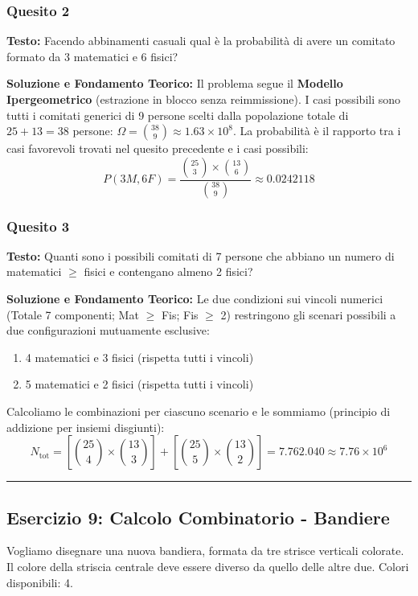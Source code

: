 \documentclass[12pt, a4paper]{article}
\begin{document}
\subsubsection*{Quesito 2}
\textbf{Testo:} Facendo abbinamenti casuali qual è la probabilità di avere un comitato formato da 3 matematici e 6 fisici?

\textbf{Soluzione e Fondamento Teorico:} 
Il problema segue il \textbf{Modello Ipergeometrico} (estrazione in blocco senza reimmissione).
I casi possibili sono tutti i comitati generici di 9 persone scelti dalla popolazione totale di $25 + 13 = 38$ persone: $\Omega = \binom{38}{9} \approx 1.63 \times 10^8$.
La probabilità è il rapporto tra i casi favorevoli trovati nel quesito precedente e i casi possibili:
$$ P(3M, 6F) = \frac{\binom{25}{3} \times \binom{13}{6}}{\binom{38}{9}} \approx 0.0242118 $$

\subsubsection*{Quesito 3}
\textbf{Testo:} Quanti sono i possibili comitati di 7 persone che abbiano un numero di matematici $\ge$ fisici e contengano almeno 2 fisici?

\textbf{Soluzione e Fondamento Teorico:} 
Le due condizioni sui vincoli numerici (Totale 7 componenti; Mat $\ge$ Fis; Fis $\ge$ 2) restringono gli scenari possibili a due configurazioni mutuamente esclusive:
\begin{enumerate}
    \item 4 matematici e 3 fisici (rispetta tutti i vincoli)
    \item 5 matematici e 2 fisici (rispetta tutti i vincoli)
\end{enumerate}
Calcoliamo le combinazioni per ciascuno scenario e le sommiamo (principio di addizione per insiemi disgiunti):
$$ N_{\text{tot}} = \left[\binom{25}{4} \times \binom{13}{3}\right] + \left[\binom{25}{5} \times \binom{13}{2}\right] = 7.762.040 \approx 7.76 \times 10^6 $$

\vspace{0.5cm}\hrule\vspace{0.5cm}

\subsection*{Esercizio 9: Calcolo Combinatorio - Bandiere}
Vogliamo disegnare una nuova bandiera, formata da tre strisce verticali colorate. Il colore della striscia centrale deve essere diverso da quello delle altre due. Colori disponibili: 4.
\end{document}
